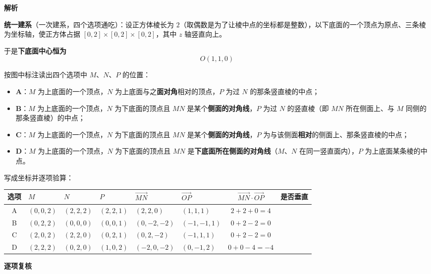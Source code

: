 \textbf{解析}

\textbf{统一建系}（一次建系，四个选项通吃）：设正方体棱长为 $2$（取偶数是为了让棱中点的坐标都是整数），以下底面的一个顶点为原点、三条棱为坐标轴，使正方体占据 $[0,2]\times[0,2]\times[0,2]$，其中 $z$ 轴竖直向上。

于是\textbf{下底面中心恒为}
\[O(1,1,0)\]

按图中标注读出四个选项中 $M$、$N$、$P$ 的位置：

\begin{itemize}
\item \textbf{A}：$M$ 为上底面的一个顶点，$N$ 为上底面与之\textbf{面对角}相对的顶点，$P$ 为过 $N$ 的那条竖直棱的中点；
\item \textbf{B}：$M$ 为上底面的一个顶点，$N$ 为下底面的顶点且 $MN$ 是某个\textbf{侧面的对角线}，$P$ 为过 $N$ 的竖直棱（即 $MN$ 所在侧面上、与 $M$ 同侧的那条竖直棱）的中点；
\item \textbf{C}：$M$ 为上底面的一个顶点，$N$ 为下底面的顶点且 $MN$ 是某个\textbf{侧面的对角线}，$P$ 为与该侧面\textbf{相对}的侧面上、那条竖直棱的中点；
\item \textbf{D}：$M$ 为上底面的一个顶点，$N$ 为下底面的顶点且 $MN$ 是\textbf{下底面所在侧面的对角线}（$M$、$N$ 在同一竖直面内），$P$ 为上底面某条棱的中点。
\end{itemize}

写成坐标并逐项验算：

\begin{center}
\begingroup\setlength{\tabcolsep}{4pt}
\begin{tabular}{clllllcc}
\toprule
选项 & $M$ & $N$ & $P$ & $\overrightarrow{MN}$ & $\overrightarrow{OP}$ & $\overrightarrow{MN}\cdot\overrightarrow{OP}$ & 是否垂直 \\
\midrule
A & $(0,0,2)$ & $(2,2,2)$ & $(2,2,1)$ & $(2,2,0)$ & $(1,1,1)$ & $2+2+0=4$ &  \\
B & $(0,2,2)$ & $(0,0,0)$ & $(0,0,1)$ & $(0,-2,-2)$ & $(-1,-1,1)$ & $0+2-2=0$ &  \\
C & $(2,0,2)$ & $(2,2,0)$ & $(0,2,1)$ & $(0,2,-2)$ & $(-1,1,1)$ & $0+2-2=0$ &  \\
D & $(2,2,2)$ & $(0,2,0)$ & $(1,0,2)$ & $(-2,0,-2)$ & $(0,-1,2)$ & $0+0-4=-4$ &  \\
\bottomrule
\end{tabular}
\endgroup
\end{center}

\par\medskip

\textbf{逐项复核}

